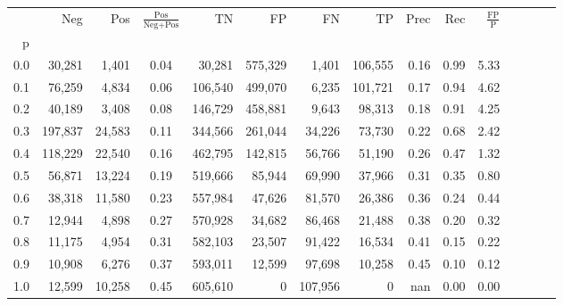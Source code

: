\begin{tabular}{rrrcrrrrrrrrrrr}
\toprule
{} &      Neg &     Pos & $\frac{\text{Pos}}{\text{Neg}+\text{Pos}}$ &       TN &       FP &       FN &       TP &  Prec &   Rec & $\frac{\text{FP}}{\text{P}}$ \\
p   &          &         &                                            &          &          &          &          &       &       &                              \\
\midrule
0.0 &   30,281 &   1,401 &                                       0.04 &   30,281 &  575,329 &    1,401 &  106,555 &  0.16 &  0.99 &                         5.33 \\
0.1 &   76,259 &   4,834 &                                       0.06 &  106,540 &  499,070 &    6,235 &  101,721 &  0.17 &  0.94 &                         4.62 \\
0.2 &   40,189 &   3,408 &                                       0.08 &  146,729 &  458,881 &    9,643 &   98,313 &  0.18 &  0.91 &                         4.25 \\
0.3 &  197,837 &  24,583 &                                       0.11 &  344,566 &  261,044 &   34,226 &   73,730 &  0.22 &  0.68 &                         2.42 \\
0.4 &  118,229 &  22,540 &                                       0.16 &  462,795 &  142,815 &   56,766 &   51,190 &  0.26 &  0.47 &                         1.32 \\
0.5 &   56,871 &  13,224 &                                       0.19 &  519,666 &   85,944 &   69,990 &   37,966 &  0.31 &  0.35 &                         0.80 \\
0.6 &   38,318 &  11,580 &                                       0.23 &  557,984 &   47,626 &   81,570 &   26,386 &  0.36 &  0.24 &                         0.44 \\
0.7 &   12,944 &   4,898 &                                       0.27 &  570,928 &   34,682 &   86,468 &   21,488 &  0.38 &  0.20 &                         0.32 \\
0.8 &   11,175 &   4,954 &                                       0.31 &  582,103 &   23,507 &   91,422 &   16,534 &  0.41 &  0.15 &                         0.22 \\
0.9 &   10,908 &   6,276 &                                       0.37 &  593,011 &   12,599 &   97,698 &   10,258 &  0.45 &  0.10 &                         0.12 \\
1.0 &   12,599 &  10,258 &                                       0.45 &  605,610 &        0 &  107,956 &        0 &   nan &  0.00 &                         0.00 \\
\bottomrule
\end{tabular}
